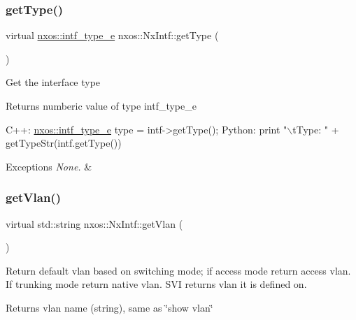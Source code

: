 \subsubsection{\texorpdfstring{get\+Type()}{getType()}}
{\footnotesize\ttfamily virtual \mbox{\hyperlink{namespacenxos_ab2989ad42c12bf1e273c8acd10ffb984}{nxos\+::intf\+\_\+type\+\_\+e}} nxos\+::\+Nx\+Intf\+::get\+Type (\begin{DoxyParamCaption}{ }\end{DoxyParamCaption})\hspace{0.3cm}{\ttfamily [pure virtual]}}

Get the interface type

\begin{DoxyReturn}{Returns}
numberic value of type intf\+\_\+type\+\_\+e
\end{DoxyReturn}

\begin{DoxyCode}
C++:
       \mbox{\hyperlink{namespacenxos_ab2989ad42c12bf1e273c8acd10ffb984}{nxos::intf\_type\_e}}   type = intf->getType();
Python:
       print \textcolor{stringliteral}{"\(\backslash\)tType: "} + getTypeStr(intf.getType())
\end{DoxyCode}



\begin{DoxyExceptions}{Exceptions}
{\em None.} & \\
\hline
\end{DoxyExceptions}
\mbox{\label{classnxos_1_1_nx_intf_a3f7942d5ae1a998904d9ea97b252eb21}} 
\subsubsection{\texorpdfstring{get\+Vlan()}{getVlan()}}
{\footnotesize\ttfamily virtual std\+::string nxos\+::\+Nx\+Intf\+::get\+Vlan (\begin{DoxyParamCaption}{ }\end{DoxyParamCaption})\hspace{0.3cm}{\ttfamily [pure virtual]}}

Return default vlan based on switching mode; if access mode return access vlan. If trunking mode return native vlan. S\+VI returns vlan it is defined on.

\begin{DoxyReturn}{Returns}
vlan name (string), same as \char`\"{}show vlan\char`\"{}
\end{DoxyReturn}

